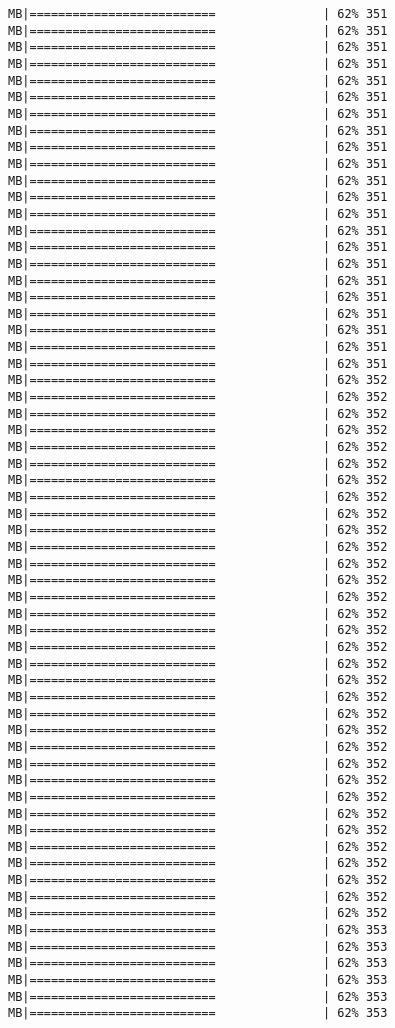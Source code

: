 \documentclass[
]{article}
\begin{document}
\begin{verbatim}
MB|==========================               | 62% 351 MB|==========================               | 62% 351 MB|==========================               | 62% 351 MB|==========================               | 62% 351 MB|==========================               | 62% 351 MB|==========================               | 62% 351 MB|==========================               | 62% 351 MB|==========================               | 62% 351 MB|==========================               | 62% 351 MB|==========================               | 62% 351 MB|==========================               | 62% 351 MB|==========================               | 62% 351 MB|==========================               | 62% 351 MB|==========================               | 62% 351 MB|==========================               | 62% 351 MB|==========================               | 62% 351 MB|==========================               | 62% 351 MB|==========================               | 62% 351 MB|==========================               | 62% 351 MB|==========================               | 62% 351 MB|==========================               | 62% 351 MB|==========================               | 62% 351 MB|==========================               | 62% 352 MB|==========================               | 62% 352 MB|==========================               | 62% 352 MB|==========================               | 62% 352 MB|==========================               | 62% 352 MB|==========================               | 62% 352 MB|==========================               | 62% 352 MB|==========================               | 62% 352 MB|==========================               | 62% 352 MB|==========================               | 62% 352 MB|==========================               | 62% 352 MB|==========================               | 62% 352 MB|==========================               | 62% 352 MB|==========================               | 62% 352 MB|==========================               | 62% 352 MB|==========================               | 62% 352 MB|==========================               | 62% 352 MB|==========================               | 62% 352 MB|==========================               | 62% 352 MB|==========================               | 62% 352 MB|==========================               | 62% 352 MB|==========================               | 62% 352 MB|==========================               | 62% 352 MB|==========================               | 62% 352 MB|==========================               | 62% 352 MB|==========================               | 62% 352 MB|==========================               | 62% 352 MB|==========================               | 62% 352 MB|==========================               | 62% 352 MB|==========================               | 62% 352 MB|==========================               | 62% 352 MB|==========================               | 62% 352 MB|==========================               | 62% 352 MB|==========================               | 62% 353 MB|==========================               | 62% 353 MB|==========================               | 62% 353 MB|==========================               | 62% 353 MB|==========================               | 62% 353 MB|==========================               | 62% 353 
\end{verbatim}
\end{document}
